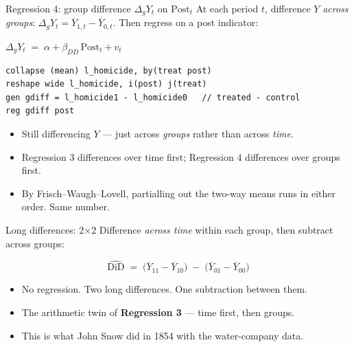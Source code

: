 \documentclass[aspectratio=169,11pt]{beamer}
\begin{document}
\begin{frame}[fragile]{Regression 4: group difference $\Delta_g Y_t$ on $\text{Post}_t$}
\vspace{0.3em}
At each period $t$, difference $Y$ \textit{across groups}: \;$\Delta_g Y_t = \overline{Y}_{1,t} - \overline{Y}_{0,t}$. \;Then regress on a post indicator:
\vspace{0.3em}
\begin{center}
$\Delta_g Y_t \;=\; \alpha + \beta_{DD}\,\text{Post}_t + v_t$
\end{center}
\vspace{0.3em}
\begin{lstlisting}[language={[ANSI]C}]
collapse (mean) l_homicide, by(treat post)
reshape wide l_homicide, i(post) j(treat)
gen gdiff = l_homicide1 - l_homicide0   // treated - control
reg gdiff post
\end{lstlisting}
\vspace{0.2em}
\begin{itemize}\small
  \item Still differencing $Y$ --- just across \textit{groups} rather than across \textit{time}.
  \item Regression 3 differences over time first; Regression 4 differences over groups first.
  \item By Frisch--Waugh--Lovell, partialling out the two-way means runs in either order. \;Same number.
\end{itemize}
\end{frame}

\begin{frame}{Long differences: 2$\times$2}
\vspace{0.5em}
Difference \textit{across time} within each group, then subtract across groups:
\vspace{0.3em}
\begin{center}
\Large
\[
\widehat{\text{DiD}} \;=\; \big(\overline{Y}_{11} - \overline{Y}_{10}\big) \;-\; \big(\overline{Y}_{01} - \overline{Y}_{00}\big)
\]
\end{center}
\vspace{0.3em}
\begin{itemize}\small
  \item No regression. \;Two long differences. \;One subtraction between them.
  \item The arithmetic twin of \textbf{Regression 3} --- time first, then groups.
  \item This is what John Snow did in 1854 with the water-company data.
\end{itemize}
\end{frame}
\end{document}
